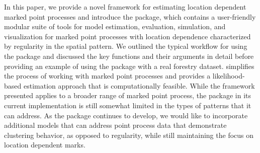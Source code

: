 In this paper, we provide a novel framework for estimating location
dependent marked point processes and introduce the  package,
which contains a user-friendly modular suite of tools for model
estimation, evaluation, simulation, and visualization for marked point
processes with location dependence characterized by regularity in the
spatial pattern. We outlined the typical workflow for using the package
and discussed the key functions and their arguments in detail before
providing an example of using the package with a real forestry dataset.
 simplifies the process of working with marked point
processes and provides a likelihood-based estimation approach that is
computationally feasible. While the framework presented applies to a
broader range of marked point process, the package in its current
implementation is still somewhat limited in the types of patterns that
it can address. As the package continues to develop, we would like to incorporate additional models that can
address point process data that demonstrate clustering behavior, as
opposed to regularity, while still maintaining the focus on location
dependent marks.



\address{%
Lane Drew\\
Colorado State University\\%
Department of Statistics, Colorado State University\\ 851 Oval Dr, Fort Collins, CO 80524\\
%
\url{https://lanedrew.com/}\\%
\textit{ORCiD: \href{https://orcid.org/0009-0006-5427-4092}{0009-0006-5427-4092}}\\%
\href{mailto:lane.drew@colostate.edu}{\nolinkurl{lane.drew@colostate.edu}}%
}

\address{%
Andee Kaplan\\
Colorado State University\\%
Department of Statistics, Colorado State University\\ 851 Oval Dr, Fort Collins, CO 80524\\
%
\url{https://andeekaplan.com/}\\%
\textit{ORCiD: \href{https://orcid.org/0000-0002-0912-0225}{0000-0002-0912-0225}}\\%
\href{mailto:andee.kaplan@colostate.edu}{\nolinkurl{andee.kaplan@colostate.edu}}%
}
